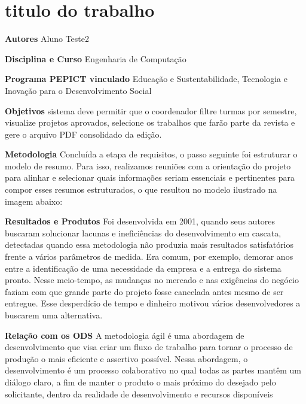 \documentclass[12pt,openright,oneside,a4paper]{report}
\begin{document}
\vspace{0.7cm}
\section{titulo do trabalho}
\noindent
\textbf{Autores}
Aluno Teste2

\vspace{0.7cm}
\noindent
\textbf{Disciplina e Curso}
Engenharia de Computação

\vspace{0.7cm}
\noindent
\textbf{Programa PEPICT vinculado}
Educação e Sustentabilidade, Tecnologia e Inovação para o Desenvolvimento Social

\vspace{0.7cm}
\noindent
\textbf{Objetivos}
sistema deve permitir que o coordenador filtre turmas por semestre, visualize projetos aprovados, selecione os trabalhos que farão parte da revista e gere o arquivo PDF consolidado da edição.

\vspace{0.7cm}
\noindent
\textbf{Metodologia}
Concluída a etapa de requisitos, o passo seguinte foi estruturar o modelo de resumo. Para isso, realizamos reuniões com a orientação do projeto para alinhar e selecionar quais informações seriam essenciais e pertinentes para compor esses resumos estruturados, o que resultou no modelo ilustrado na imagem abaixo:

\vspace{0.7cm}
\noindent
\textbf{Resultados e Produtos}
Foi desenvolvida em 2001, quando seus autores buscaram solucionar lacunas e ineficiências do desenvolvimento em cascata, detectadas quando essa metodologia não produzia mais resultados satisfatórios frente a vários parâmetros de medida. Era comum, por exemplo,  demorar anos entre a identificação de uma necessidade da empresa e a entrega do sistema pronto. Nesse meio-tempo, as mudanças no mercado e nas exigências do negócio faziam com que grande parte do projeto fosse cancelada antes mesmo de ser entregue. Esse desperdício de tempo e dinheiro motivou vários desenvolvedores a buscarem uma alternativa.

\vspace{0.7cm}
\noindent
\textbf{Relação com os ODS}
A metodologia ágil é uma abordagem de desenvolvimento que visa criar um fluxo de trabalho para tornar o processo de produção o mais eficiente e assertivo possível. Nessa abordagem, o desenvolvimento é um processo colaborativo no qual todas as partes mantêm um diálogo claro, a fim de manter o produto o mais próximo do desejado pelo solicitante, dentro da realidade de desenvolvimento e recursos disponíveis
\end{document}
